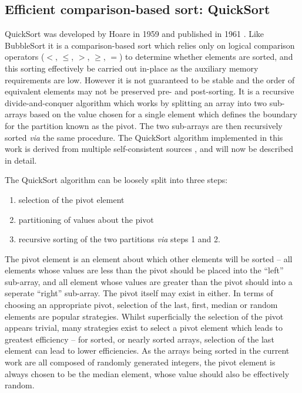 \documentclass[12pt,a4paper]{article}
\begin{document}
\clearpage

\subsection{Efficient comparison-based sort: QuickSort}
QuickSort was developed by Hoare in 1959 and published in 1961 \cite{hoare_algorithm_1961}. Like BubbleSort it is a comparison-based sort which relies only on logical comparison operators ($<$, $\leq$, $>$, $\geq$, $=$) to determine whether elements are sorted, and this sorting effectively be carried out in-place as the auxiliary memory requirements are low. However it is not guaranteed to be stable and the order of equivalent elements may not be preserved pre- and post-sorting. It is a recursive divide-and-conquer algorithm which works by splitting an array into two sub-arrays based on the value chosen for a single element which defines the boundary for the partition known as the pivot. The two sub-arrays are then recursively sorted \emph{via} the same procedure. The QuickSort algorithm implemented in this work is derived from multiple self-consistent sources  \cite{quickSort1, quickSort2, quickSort3}, and will now be described in detail.

The QuickSort algorithm can be loosely split into three steps:
\begin{enumerate}
\item selection of the pivot element
\item partitioning of values about the pivot
\item recursive sorting of the two partitions \emph{via} steps 1 and 2.
\end{enumerate}

The pivot element is an element about which other elements will be sorted -- all elements whose values are less than the pivot should be placed into the ``left'' sub-array, and all element whose values are greater than the pivot should into a seperate ``right'' sub-array. The pivot itself may exist in either. In terms of choosing an appropriate pivot, selection of the last, first, median or random elements are popular strategies. Whilst superficially the selection of the pivot appears trivial, many strategies exist to select a pivot element which leads to greatest efficiency -- for sorted, or nearly sorted arrays, selection of the last element can lead to lower efficiencies. As the arrays being sorted in the current work are all composed of randomly generated integers, the pivot element is always chosen to be the median element, whose value should also be effectively random.
\end{document}
